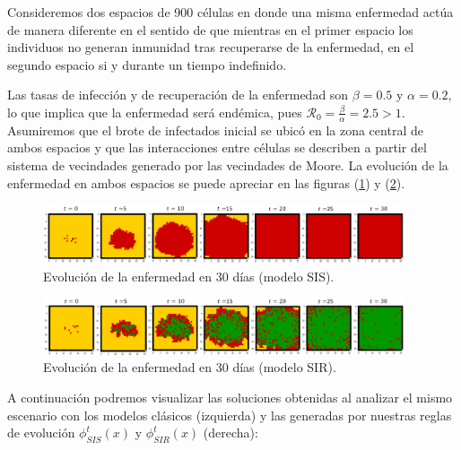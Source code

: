 \begin{example}\label{ex:SISySIRclásicovsModeloEnAC}
Consideremos dos espacios de 900 células en donde una misma enfermedad actúa de manera diferente en el sentido de que mientras en el primer espacio los individuos no generan inmunidad tras recuperarse de la enfermedad, en el segundo espacio si y durante un tiempo indefinido.

Las tasas de infección y de recuperación de la enfermedad son $\beta=0.5$ y $\alpha=0.2$, lo que implica que la enfermedad será endémica, pues $\mathcal{R}_0=\frac{\beta}{\alpha}=2.5>1$. Asumiremos que el brote de infectados inicial se ubicó en la zona central de ambos espacios y que las interacciones entre células se describen a partir del sistema de vecindades generado por las vecindades de Moore. La evolución de la enfermedad en ambos espacios se puede apreciar en las figuras (\ref{fig:sisEn30}) y (\ref{fig:sirEn30}).

\newpage

\begin{figure}[h]
  \centering
    \includegraphics[width=0.95\textwidth]{Imagenes/sisEn30.PNG}
    \caption{Evolución de la enfermedad en 30 días (modelo SIS).}
    \label{fig:sisEn30}
\end{figure}
\begin{figure}[h]
  \centering
    \includegraphics[width=0.95\textwidth]{Imagenes/sirEn30.PNG}
    \caption{Evolución de la enfermedad en 30 días (modelo SIR).}
    \label{fig:sirEn30}
\end{figure}

A continuación podremos visualizar las soluciones obtenidas al analizar el mismo escenario con los modelos clásicos (izquierda) y las generadas por nuestras reglas de evolución $\phi_{SIS}^t(x)$ y $\phi_{SIR}^t(x)$ (derecha):


\end{example}
